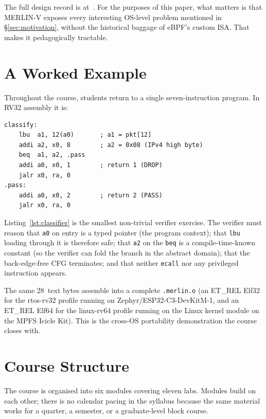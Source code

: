 \documentclass[11pt,a4paper]{article}
\begin{document}
The full design record is at~\cite{merlinv-design}.  For the
purposes of this paper, what matters is that MERLIN-V exposes
every interesting OS-level problem mentioned in
\S\ref{sec:motivation}, without the historical baggage of eBPF's
custom ISA.  That makes it pedagogically tractable.

\section{A Worked Example}
\label{sec:example}

Throughout the course, students return to a single seven-instruction
program.  In RV32 assembly it is:

\begin{lstlisting}[language=rvasm,caption={Packet-EtherType classifier.},label=lst:classifier]
classify:
    lbu  a1, 12(a0)       ; a1 = pkt[12]
    addi a2, x0, 8        ; a2 = 0x08 (IPv4 high byte)
    beq  a1, a2, .pass
    addi a0, x0, 1        ; return 1 (DROP)
    jalr x0, ra, 0
.pass:
    addi a0, x0, 2        ; return 2 (PASS)
    jalr x0, ra, 0
\end{lstlisting}

Listing~\ref{lst:classifier} is the smallest non-trivial
verifier exercise.  The verifier must reason that
\texttt{a0} on entry is a typed pointer (the program context);
that \texttt{lbu} loading through it is therefore safe; that
\texttt{a2} on the \texttt{beq} is a compile-time-known constant
(so the verifier can fold the branch in the abstract domain);
that the back-edge-free CFG terminates; and that neither
\texttt{ecall} nor any privileged instruction appears.

The same 28~text bytes assemble into a complete
\texttt{.merlin.o} (an ET\_REL Elf32 for the rtos-rv32 profile
running on Zephyr/ESP32-C3-DevKitM-1, and an ET\_REL Elf64 for
the linux-rv64 profile running on the Linux kernel module on
the MPFS Icicle Kit).  This is the cross-OS portability
demonstration the course closes with.

\section{Course Structure}
\label{sec:course}

The course is organised into six modules covering eleven labs.
Modules build on each other; there is no calendar pacing in the
syllabus because the same material works for a quarter, a
semester, or a graduate-level block course.
\end{document}
